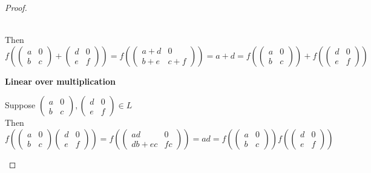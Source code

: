 \documentclass{article} %
\begin{document}
\begin{addmargin}[1em]{0em}
\begin{proof}
\begin{addmargin}[1em]{0em}
\\Then $f(\left( \begin{smallmatrix} a & 0 \\ b & c \end{smallmatrix} \right) + \left( \begin{smallmatrix} d & 0 \\ e & f \end{smallmatrix} \right)) = f(\left( \begin{smallmatrix} a+d & 0 \\ b+e & c+f \end{smallmatrix} \right)) = a + d = f(\left( \begin{smallmatrix} a & 0 \\ b & c \end{smallmatrix} \right)) + f(\left( \begin{smallmatrix} d & 0 \\ e & f \end{smallmatrix} \right))$
\end{addmargin}
\textbf{Linear over multiplication}
\begin{addmargin}[1em]{0em}
Suppose $ \left( \begin{smallmatrix} a & 0 \\ b & c \end{smallmatrix} \right),  \left( \begin{smallmatrix} d & 0 \\ e & f \end{smallmatrix} \right) \in L$
\\Then $f(\left( \begin{smallmatrix} a & 0 \\ b & c \end{smallmatrix} \right) \left( \begin{smallmatrix} d & 0 \\ e & f \end{smallmatrix} \right)) = f(\left( \begin{smallmatrix} ad & 0 \\ db + ec & fc \end{smallmatrix} \right)) = ad = f(\left( \begin{smallmatrix} a & 0 \\ b & c \end{smallmatrix} \right)) f(\left( \begin{smallmatrix} d & 0 \\ e & f \end{smallmatrix} \right))$
\end{addmargin}

\end{proof}
\end{addmargin}
\end{document}
